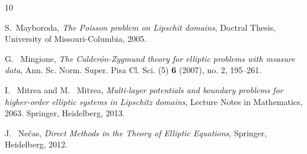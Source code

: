 \documentclass[reqno,centertags,11pt]{amsart}
\theoremstyle{definition}
\numberwithin{thm}{section}
\numberwithin{equation}{section}
\begin{document}
\begin{thebibliography}{10}








S.~Mayboroda, \emph{The Poisson problem on Lipschit domains}, Doctral Thesis, University of Missouri-Columbia, 2005.

G. ~Mingione, \emph{The Calderón-Zygmund theory for elliptic problems with measure data}, Ann. Sc. Norm. Super. Pisa Cl. Sci. (5) \textbf{6} (2007), no. 2, 195--261.


I. ~Mitrea and M. ~Mitrea, \emph{Multi-layer potentials and boundary problems for higher-order elliptic systems in Lipschitz domains},
Lecture Notes in Mathematics, 2063. Springer, Heidelberg, 2013.



J. ~Nečas, \emph{Direct Methods in the Theory of Elliptic Equations},  Springer, Heidelberg, 2012.




\end{thebibliography}
\end{document}
